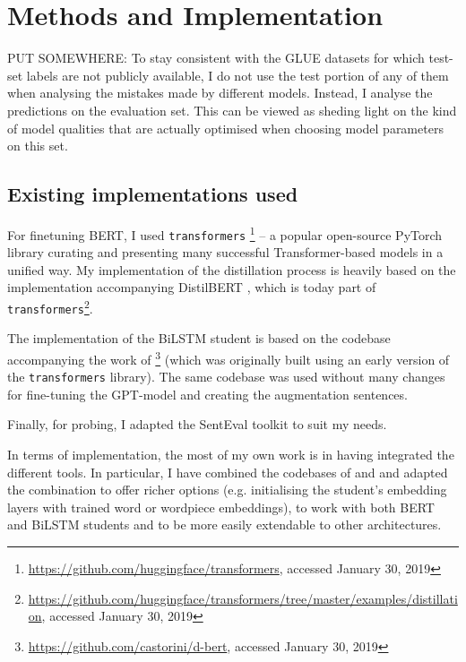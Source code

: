 \documentclass[bsc,frontabs,twoside,singlespacing,parskip,deptreport]{infthesis}
\begin{document}
\chapter{Methods and Implementation}{

  PUT SOMEWHERE: To stay consistent with the GLUE datasets for which test-set labels are not publicly available, I do not use the test portion of any of them when analysing the mistakes made by different models. Instead, I analyse the predictions on the evaluation set. This can be viewed as sheding light on the kind of model qualities that are actually optimised when choosing model parameters on this set.

  \label{chap:methods-implementation}
  \section{Existing implementations used}{
    For finetuning BERT, I used \verb|transformers| \citep{Wolf_2019}\footnote{\url{https://github.com/huggingface/transformers}, accessed January 30, 2019} -- a popular open-source PyTorch library curating and presenting many successful Transformer-based models in a unified way.
    My implementation of the distillation process is heavily based on the implementation accompanying DistilBERT \citep{Sanh_2019}, which is today part of \verb|transformers|\footnote{\url{https://github.com/huggingface/transformers/tree/master/examples/distillation}, accessed January 30, 2019}.

    The implementation of the BiLSTM student is based on the codebase accompanying the work of \citet{Tang_2019b}\footnote{\url{https://github.com/castorini/d-bert}, accessed January 30, 2019} (which was originally built using an early version of the \verb|transformers| library). The same codebase was used without many changes for fine-tuning the GPT-model and creating the augmentation sentences.

    Finally, for probing, I adapted the SentEval toolkit \citep{SentEval-paper} to suit my needs.

    In terms of implementation, the most of my own work is in having integrated the different tools. In particular, I have combined the codebases of \citet{Sanh_2019} and \citet{Tang_2019b} and adapted the combination to offer richer options (e.g. initialising the student's embedding layers with trained word or wordpiece embeddings), to work with both BERT and BiLSTM students and to be more easily extendable to other architectures.
  }
}
\end{document}
